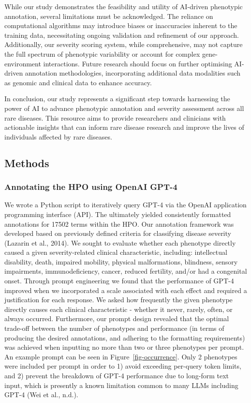 \documentclass[
]{agujournal2019}
\begin{document}
While our study demonstrates the feasibility and utility of AI-driven
phenotypic annotation, several limitations must be acknowledged. The
reliance on computational algorithms may introduce biases or
inaccuracies inherent to the training data, necessitating ongoing
validation and refinement of our approach. Additionally, our severity
scoring system, while comprehensive, may not capture the full spectrum
of phenotypic variability or account for complex gene-environment
interactions. Future research should focus on further optimising
AI-driven annotation methodologies, incorporating additional data
modalities such as genomic and clinical data to enhance accuracy.

In conclusion, our study represents a significant step towards
harnessing the power of AI to advance phenotypic annotation and severity
assessment across all rare diseases. This resource aims to provide
researchers and clinicians with actionable insights that can inform rare
disease research and improve the lives of individuals affected by rare
diseases.

\subsection{Methods}\label{methods}

\subsubsection{Annotating the HPO using OpenAI
GPT-4}\label{annotating-the-hpo-using-openai-gpt-4}

We wrote a Python script to iteratively query GPT-4 via the OpenAI
application programming interface (API). The ultimately yielded
consistently formatted annotations for 17502 terms within the HPO. Our
annotation framework was developed based on previously defined criteria
for classifying disease severity (Lazarin et al., 2014). We sought to
evaluate whether each phenotype directly caused a given severity-related
clinical characteristic, including: intellectual disability, death,
impaired mobility, physical malformations, blindness, sensory
impairments, immunodeficiency, cancer, reduced fertility, and/or had a
congenital onset. Through prompt engineering we found that the
performance of GPT-4 improved when we incorporated a scale associated
with each effect and required a justification for each response. We
asked how frequently the given phenotype directly causes each clinical
characteristic - whether it never, rarely, often, or always occurred.
Furthermore, our prompt design revealed that the optimal trade-off
between the number of phenotypes and performance (in terms of producing
the desired annotations, and adhering to the formatting requirements)
was achieved when inputting no more than two or three phenotypes per
prompt. An example prompt can be seen in Figure~\ref{fig-occurrence}.
Only 2 phenotypes were included per prompt in order to 1) avoid
exceeding per-query token limits, and 2) prevent the breakdown of GPT-4
performance due to long-form text input, which is presently a known
limitation common to many LLMs including GPT-4 (Wei et al., n.d.).
\end{document}
